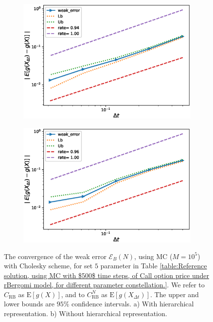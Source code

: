 \documentclass[11pt]{article}
\newcommand{\expt}[1]{\mathrm{E}\left[#1\right]}
\begin{document}
\FloatBarrier
\begin{figure}[h!]
	\centering
	\begin{subfigure}{.5\textwidth}
		\centering
		\includegraphics[width=1\linewidth]{./figures/rBergomi_weak_error_cholesky/weak_convergence_order_Bergomi_H_043_K_1_M_10_5_CI_relative_cholesky_hierarchical}
		\caption{}
	\end{subfigure}%
	\begin{subfigure}{.5\textwidth}
		\centering
		\includegraphics[width=1\linewidth]{./figures/rBergomi_weak_error_cholesky/weak_convergence_order_Bergomi_H_043_K_1_M_10_5_CI_relative_cholesky_non_hierarchical}
		\caption{}
	\end{subfigure}
	
	\caption{The  convergence of the weak error $\mathcal{E}_B(N)$, using MC ($M=10^5$) with Cholesky scheme, for set $5$ parameter in Table \ref{table:Reference solution, using MC with $500$ time steps, of Call option price under rBergomi model, for different parameter constellation.}. We refer to $C_{\text{RB}}$ as $\expt{g(X)}$, and to $C_{\text{RB}}^{N}$ as  $\expt{g(X_{\Delta t})}$. The upper and lower bounds are $95\%$ confidence intervals. a) With hierarchical representation.  b) Without hierarchical representation.}
	\label{fig:Weak_rate_set1_set_5_without_rich}
\end{figure}
\FloatBarrier
\end{document}
